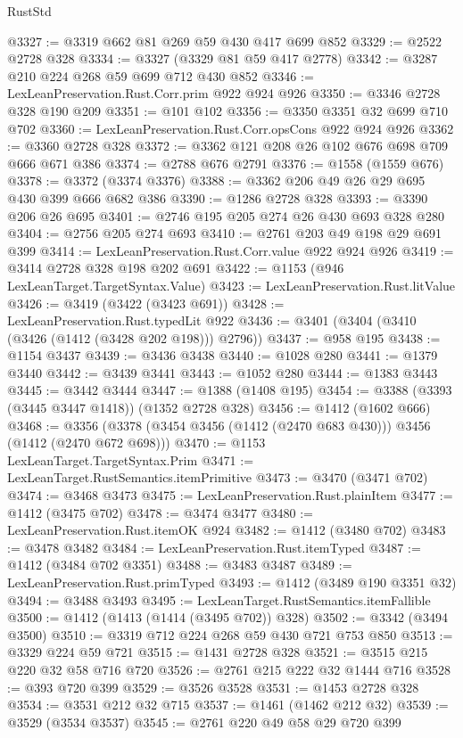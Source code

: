 \begin{lexlean}{RustStd}
\begin{coremodule}
{\begin{coremodule}
{{{{{{{{{{@3327 := @3319 @662 @81 @269 @59 @430 @417 @699 @852
@3329 := @2522 @2728 @328
@3334 := @3327 (@3329 @81 @59 @417 @2778)
@3342 := @3287 @210 @224 @268 @59 @699 @712 @430 @852
@3346 := LexLeanPreservation.Rust.Corr.prim @922 @924 @926
@3350 := @3346 @2728 @328 @190 @209
@3351 := @101 @102
@3356 := @3350 @3351 @32 @699 @710 @702
@3360 := LexLeanPreservation.Rust.Corr.opsCons @922 @924 @926
@3362 := @3360 @2728 @328
@3372 := @3362 @121 @208 @26 @102 @676 @698 @709 @666 @671 @386
@3374 := @2788 @676 @2791
@3376 := @1558 (@1559 @676)
@3378 := @3372 (@3374 @3376)
@3388 := @3362 @206 @49 @26 @29 @695 @430 @399 @666 @682 @386
@3390 := @1286 @2728 @328
@3393 := @3390 @206 @26 @695
@3401 := @2746 @195 @205 @274 @26 @430 @693 @328 @280
@3404 := @2756 @205 @274 @693
@3410 := @2761 @203 @49 @198 @29 @691 @399
@3414 := LexLeanPreservation.Rust.Corr.value @922 @924 @926
@3419 := @3414 @2728 @328 @198 @202 @691
@3422 := @1153 (@946 LexLeanTarget.TargetSyntax.Value)
@3423 := LexLeanPreservation.Rust.litValue
@3426 := @3419 (@3422 (@3423 @691))
@3428 := LexLeanPreservation.Rust.typedLit @922
@3436 := @3401 (@3404 (@3410 (@3426 (@1412 (@3428 @202 @198))) @2796))
@3437 := @958 @195
@3438 := @1154 @3437
@3439 := @3436 @3438
@3440 := @1028 @280
@3441 := @1379 @3440
@3442 := @3439 @3441
@3443 := @1052 @280
@3444 := @1383 @3443
@3445 := @3442 @3444
@3447 := @1388 (@1408 @195)
@3454 := @3388 (@3393 (@3445 @3447 @1418)) (@1352 @2728 @328)
@3456 := @1412 (@1602 @666)
@3468 := @3356 (@3378 (@3454 @3456 (@1412 (@2470 @683 @430))) @3456 (@1412 (@2470 @672 @698)))
@3470 := @1153 LexLeanTarget.TargetSyntax.Prim
@3471 := LexLeanTarget.RustSemantics.itemPrimitive
@3473 := @3470 (@3471 @702)
@3474 := @3468 @3473
@3475 := LexLeanPreservation.Rust.plainItem
@3477 := @1412 (@3475 @702)
@3478 := @3474 @3477
@3480 := LexLeanPreservation.Rust.itemOK @924
@3482 := @1412 (@3480 @702)
@3483 := @3478 @3482
@3484 := LexLeanPreservation.Rust.itemTyped
@3487 := @1412 (@3484 @702 @3351)
@3488 := @3483 @3487
@3489 := LexLeanPreservation.Rust.primTyped
@3493 := @1412 (@3489 @190 @3351 @32)
@3494 := @3488 @3493
@3495 := LexLeanTarget.RustSemantics.itemFallible
@3500 := @1412 (@1413 (@1414 (@3495 @702)) @328)
@3502 := @3342 (@3494 @3500)
@3510 := @3319 @712 @224 @268 @59 @430 @721 @753 @850
@3513 := @3329 @224 @59 @721
@3515 := @1431 @2728 @328
@3521 := @3515 @215 @220 @32 @58 @716 @720
@3526 := @2761 @215 @222 @32 @1444 @716
@3528 := @393 @720 @399
@3529 := @3526 @3528
@3531 := @1453 @2728 @328
@3534 := @3531 @212 @32 @715
@3537 := @1461 (@1462 @212 @32)
@3539 := @3529 (@3534 @3537)
@3545 := @2761 @220 @49 @58 @29 @720 @399
}}}}}}}}}}
\end{coremodule}}
\end{coremodule}
\end{lexlean}
